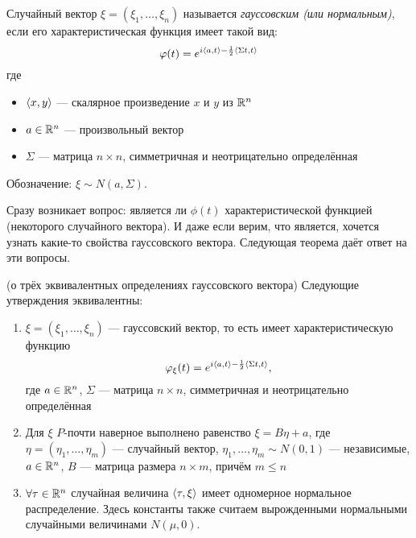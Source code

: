 \begin{definition}
    Случайный вектор $\xi = (\xi_1, \ldots, \xi_n)$ называется \textit{гауссовским (или нормальным)}, если его характеристическая функция имеет такой вид:
    \[
        \varphi(t) = e^{i \left\langle a, t\right\rangle - \frac{1}{2} \left\langle\Sigma t, t\right\rangle}
    \]
    где
    \begin{itemize}
        \item $\left\langle x, y\right\rangle$ --- скалярное произведение $x$ и $y$ из $\mathbb{R}^n$
        
        \item $a \in \mathbb{R}^n$ --- произвольный вектор
        
        \item $\Sigma$ --- матрица $n \times n$, симметричная и неотрицательно определённая
    \end{itemize}
    Обозначение: $\xi \sim N(a, \Sigma)$.
\end{definition}

\begin{note}
    Сразу возникает вопрос: является ли $\phi(t)$ характеристической функцией (некоторого случайного вектора). И даже если верим, что является, хочется узнать какие-то свойства гауссовского вектора. Следующая теорема даёт ответ на эти вопросы.
\end{note}

\begin{theorem} (о трёх эквивалентных определениях гауссовского вектора)
    Следующие утверждения эквивалентны:
    \begin{enumerate}
        \item $\xi = (\xi_1, \ldots, \xi_n)$ --- гауссовский вектор, то есть имеет характеристическую функцию
        \[
            \varphi_\xi(t) = e^{i \left\langle a, t\right\rangle - \frac{1}{2} \left\langle\Sigma t, t\right\rangle},
        \]
        где $a \in \mathbb{R}^n$, $\Sigma$ --- матрица $n \times n$, симметричная и неотрицательно определённая

        \item Для $\xi$ $P$-почти наверное выполнено равенство $\xi = B\eta + a$, где $\eta = (\eta_1, \ldots, \eta_m)$ --- случайный вектор, $\eta_1, \ldots, \eta_m \sim N(0, 1)$ --- независимые, $a \in \mathbb{R}^n$, $B$ --- матрица размера $n \times m$, причём $m \le n$

        \item $\forall \tau \in \mathbb{R}^n$ случайная величина  $\left\langle\tau, \xi\right\rangle$ имеет одномерное нормальное распределение. Здесь константы также считаем вырожденными нормальными случайными величинами $N(\mu, 0)$.
    \end{enumerate}
\end{theorem}


